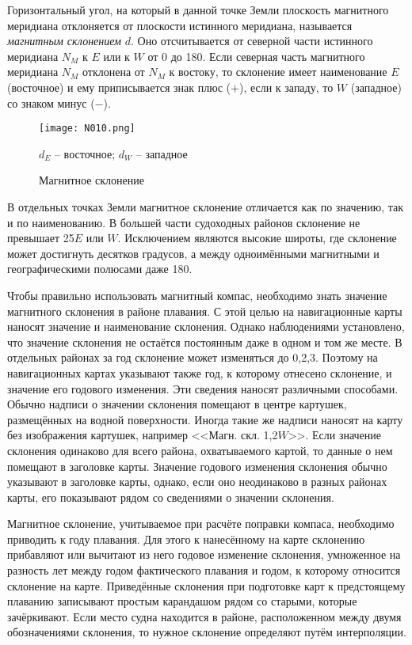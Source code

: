 Горизонтальный угол, на который в данной точке Земли плоскость
магнитного меридиана отклоняется от плоскости истинного меридиана,
называется \textit{магнитным склонением}
$d$. Оно отсчитывается от северной части истинного меридиана $N_M$ к
$E$ или к $W$ от 0 до 180\gr. Если северная часть магнитного меридиана
$N_M$ отклонена от $N_M$ к востоку, то склонение имеет наименование
$E$ (восточное) и ему приписывается знак плюс ($+$), если к западу, то
$W$ (западное) со знаком минус ($-$).

\begin{figure}[htb]
  \centering{}
  \texttt{[image: N010.png]}
  \caption{Магнитное склонение}
  \label{fig:N10}
  \small
  \centering{}
  $d_E$ \--- восточное; $d_W$ \--- западное
\end{figure}

В отдельных точках Земли магнитное склонение отличается как по
значению, так и по наименованию. В большей части судоходных районов
склонение не превышает 25\gr $E$ или $W$. Исключением являются высокие
широты, где склонение может достигнуть десятков градусов, а между
одноимёнными магнитными и географическими полюсами даже 180\gr.

Чтобы правильно использовать магнитный компас, необходимо знать
значение магнитного склонения в районе плавания. С этой целью на
навигационные карты наносят значение и наименование склонения. Однако
наблюдениями установлено, что значение склонения не остаётся
постоянным даже в одном и том же месте. В отдельных районах за год
склонение может изменяться до 0,2,3\gr. Поэтому на
навигационных картах указывают также год, к которому отнесено
склонение, и значение его годового изменения. Эти сведения наносят
различными способами. Обычно надписи о значении склонения помещают в
центре картушек, размещённых на водной поверхности. Иногда такие же
надписи наносят на карту без изображения картушек, например
<<Магн. скл. 1,2\gr $W$>>. Если значение склонения одинаково для всего
района, охватываемого картой, то данные о нем помещают в заголовке
карты. Значение годового изменения склонения обычно указывают в
заголовке карты, однако, если оно неодинаково в разных районах карты,
его показывают рядом со сведениями о значении склонения.

Магнитное склонение, учитываемое при расчёте поправки компаса,
необходимо приводить к году плавания. Для этого к нанесённому на карте
склонению прибавляют или вычитают из него годовое изменение склонения,
умноженное на разность лет между годом фактического плавания и годом,
к которому относится склонение на карте. Приведённые склонения при
подготовке карт к предстоящему плаванию записывают простым карандашом
рядом со старыми, которые зачёркивают. Если место судна находится в
районе, расположенном между двумя обозначениями склонения, то нужное
склонение определяют путём интерполяции.


